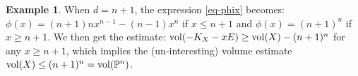 \documentclass[12pt]{amsart}
\theoremstyle{definition}
\newtheorem{rmk}[thm]{Remark}
\newtheorem{ex}[thm]{Example}
\def\dif{{\rm d}}
\def\vol{{\rm vol}}
\newcommand{\IP}{{\mathbb P}}
\begin{document}
\begin{ex}\label{ex-dn1}
When $d=n+1$, the expression \eqref{eq-phix} becomes:
$\phi(x)=(n+1)n x^{n-1}-(n-1)x^n$ if $x\le n+1$ and $\phi(x)=(n+1)^n$ if $x\ge n+1$. 
We then get the estimate: $\vol(-K_X-xE)\ge \vol(X)-(n+1)^n$ for any $x\ge n+1$, which implies the (un-interesting) volume estimate $\vol(X)\le (n+1)^n=\vol(\IP^n)$.
\end{ex}
\end{document}
